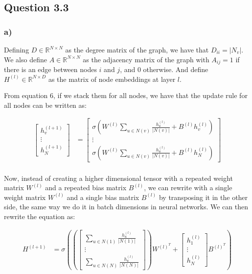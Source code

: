 \documentclass{article}
\begin{document}
\subsection*{Question 3.3}

\subsubsection*{a)}

Defining $D \in \mathbb{R}^{N \times N}$ as the degree matrix of the graph, we have that $D_{ii} = |N_v|$. We also define
$A \in \mathbb{R}^{N \times N}$ as the adjacency matrix of the graph with $A_{ij} = 1$ if there is an edge between nodes $i$ and $j$,
and $0$ otherwise. And define $H^{(l)} \in \mathbb{R}^{N \times D}$ as the matrix of node embeddings at layer $l$.

From equation 6, if we stack them for all nodes, we have that the update rule for all nodes can be written as:

\begin{align*}
    \begin{bmatrix}
        h_v^{(l+1)} \\
        \vdots \\
        h_N^{(l+1)}
    \end{bmatrix}
    & =  \begin{bmatrix}
        \sigma \left(W^{(l)} \sum_{u \in N(v)} \frac{h_u^{(l)}}{|N(v)|} + B^{(l)}h_v^{(l)}\right) \\
        \vdots \\
        \sigma \left(W^{(l)} \sum_{u \in N(v)} \frac{h_u^{(l)}}{|N(v)|} + B^{(l)}h_N^{(l)}\right)
    \end{bmatrix}  \\
\end{align*}

Now, instead of creating a higher dimensional tensor with a repeated weight matrix $W^{(l)}$ and a repeated bias matrix $B^{(l)}$,
we can rewrite with a single weight matrix $W^{(l)}$ and a single bias matrix $B^{(l)}$ by transposing it in the other side,
the same way we do it in batch dimensions in neural networks. We can then rewrite the equation as:

\begin{align*}
    H^{(l+1)} & = \sigma \left(  \left( \begin{bmatrix}
        \sum_{u \in N(1)} \frac{h_u^{(l)}}{|N(1)|} \\
        \vdots \\
        \sum_{u \in N(N)} \frac{h_u^{(l)}}{|N(N)|}
    \end{bmatrix} \right) W^{(l)^T} +  \begin{bmatrix}
        h_1^{(l)} \\
        \vdots \\
        h_N^{(l)}
    \end{bmatrix}
    B^{(l)^T}
    \right) \\
\end{align*}
\end{document}
